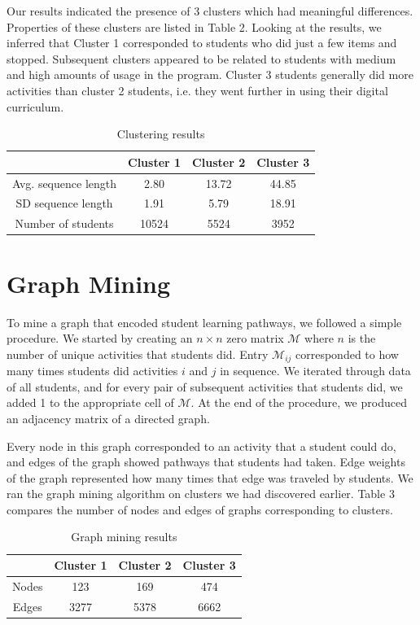 \documentclass{edm_template}
\begin{document}
Our results indicated the presence of 3 clusters which had meaningful differences. Properties of these clusters are listed in Table 2. Looking at the results, we inferred that Cluster 1 corresponded to students who did just a few items and stopped. Subsequent clusters appeared to be related to students with medium and high amounts of usage in the program. Cluster 3 students generally did more activities than cluster 2 students, i.e. they went further in using their digital curriculum.

\begin{table}
\centering
\caption{Clustering results}
\begin{tabular}{ c | c c c } \hline
                     & Cluster 1 & Cluster 2 & Cluster 3 \\ \hline
Avg. sequence length & 2.80       & 13.72      & 44.85      \\
SD sequence length   & 1.91      & 5.79       & 18.91      \\
Number of students   & 10524     & 5524      & 3952      \\
\hline \end{tabular}
\end{table}

\section{Graph Mining}
To mine a graph that encoded student learning pathways, we followed a simple procedure. We started by creating an $n \times n$ zero matrix $\mathcal{M}$ where $n$ is the number of unique activities that students did. Entry $\mathcal{M}_{ij}$ corresponded to how many times students did activities $i$ and $j$ in sequence. We iterated through data of all students, and for every pair of subsequent activities that students did, we added 1 to the appropriate cell of $\mathcal{M}$. At the end of the procedure, we produced an adjacency matrix of a directed graph.

Every node in this graph corresponded to an activity that a student could do, and edges of the graph showed pathways that students had taken. Edge weights of the graph represented how many times that edge was traveled by students. We ran the graph mining algorithm on clusters we had discovered earlier. Table 3 compares the number of nodes and edges of graphs corresponding to clusters.

\begin{table}
\centering
\caption{Graph mining results}
\begin{tabular}{ c | c c c } \hline
                    & Cluster 1 & Cluster 2 & Cluster 3 \\ \hline
Nodes               & 123       & 169       & 474       \\
Edges               & 3277      & 5378      & 6662      \\
\hline \end{tabular}
\end{table}
\end{document}
